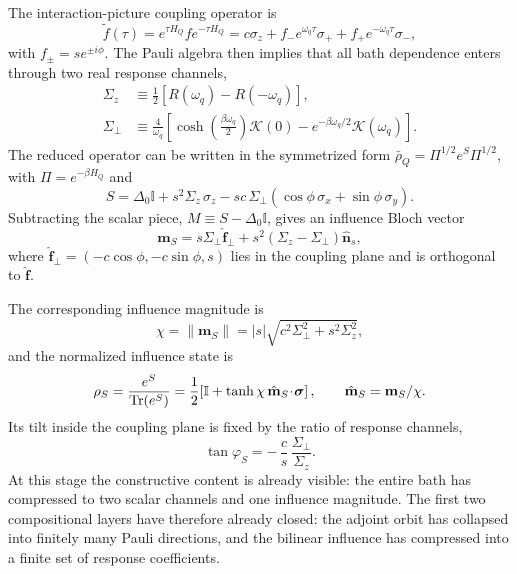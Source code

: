 The interaction-picture coupling operator is
\begin{equation}
    \tilde f(\tau)=e^{\tau H_Q}fe^{-\tau H_Q}
    = c\sigma_z + f_-e^{\omega_q\tau}\sigma_+ + f_+e^{-\omega_q\tau}\sigma_-,
\end{equation}
with $f_\pm=s e^{\pm i\phi}$. The Pauli algebra then implies that all bath
dependence enters through two real response channels,
\begin{equation}
    \begin{aligned}
    \Sigma_z &\equiv \frac{1}{2}\!\left[R(\omega_q)-R(-\omega_q)\right], \\
    \Sigma_\perp &\equiv \frac{4}{\omega_q}\!\left[
        \cosh\!\left(\frac{\beta\omega_q}{2}\right)\mathcal K(0)
        -e^{-\beta\omega_q/2}\mathcal K(\omega_q)\right].
    \end{aligned}
    \label{eq:bath_kernels_direct}
\end{equation}
The reduced operator can be written in the symmetrized form
$\bar\rho_Q=\Pi^{1/2}e^S\Pi^{1/2}$, with $\Pi=e^{-\beta H_Q}$ and
\begin{equation}
    S=\Delta_0\mathbb I
    +s^2\Sigma_z\,\sigma_z
    -sc\,\Sigma_\perp(\cos\phi\,\sigma_x+\sin\phi\,\sigma_y).
    \label{eq:S_symmetrised_v3}
\end{equation}
Subtracting the scalar piece, $M\equiv S-\Delta_0\mathbb I$, gives an influence
Bloch vector
\begin{equation}
    \mathbf m_S=
    s\Sigma_\perp\hat{\mathbf f}_\perp + s^2(\Sigma_z-\Sigma_\perp)\hat{\mathbf n}_s,
    \label{eq:mS_decomposition}
\end{equation}
where $\hat{\mathbf f}_\perp=(-c\cos\phi,-c\sin\phi,s)$ lies in the coupling
plane and is orthogonal to $\hat{\mathbf f}$.

The corresponding influence magnitude is
\begin{equation}
    \chi=\|\mathbf m_S\|
    = |s|\sqrt{c^2\Sigma_\perp^2+s^2\Sigma_z^2},
    \label{eq:chi_factored}
\end{equation}
and the normalized influence state is
\begin{equation}
    \rho_S=\frac{e^S}{\mathrm{Tr}(e^S)}
    = \frac{1}{2}\!\left[\mathbb I+\tanh\chi\,\hat{\mathbf m}_S\!\cdot\!\boldsymbol{\sigma}\right],
    \qquad
    \hat{\mathbf m}_S=\mathbf m_S/\chi.
    \label{eq:expS_closed}
\end{equation}
Its tilt inside the coupling plane is fixed by the ratio of response channels,
\begin{equation}
    \tan\varphi_S=-\,\frac{c}{s}\,\frac{\Sigma_\perp}{\Sigma_z}.
    \label{eq:phiS_def}
\end{equation}
At this stage the constructive content is already visible: the entire bath has
compressed to two scalar channels and one influence magnitude. The first two
compositional layers have therefore already closed: the adjoint orbit has
collapsed into finitely many Pauli directions, and the bilinear influence has
compressed into a finite set of response coefficients.


